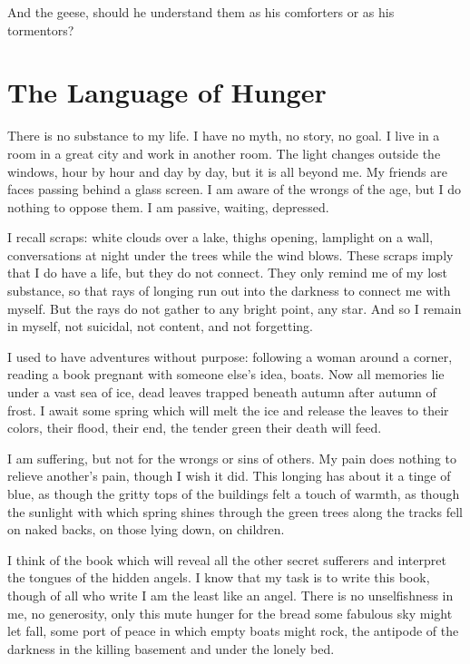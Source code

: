 \documentclass[english,11pt,letterpaper,onecolumn,parskip=full]{scrbook}
\begin{document}
	And the geese, should he understand them as his comforters or as his tormentors?

\newpage
\section{The Language of Hunger}
	There is no substance to my life.  I have no myth, no story, no goal.  I live in a room in a great city and work in another room.  The light changes outside the windows, hour by hour and day by day, but it is all beyond me.  My friends are faces passing behind a glass screen.  I am aware of the wrongs of the age, but I do nothing to oppose them.  I am passive, waiting, depressed.

	I recall scraps:  white clouds over a lake, thighs opening, lamplight on a wall, conversations at night under the trees while the wind blows.  These scraps imply that I do have a life, but they do not connect.  They only remind me of my lost substance, so that rays of longing run out into the darkness to connect me with myself.  But the rays do not gather to any bright point, any star.  And so I remain in myself, not suicidal, not content, and not forgetting.

	I used to have adventures without purpose:  following a woman around a corner, reading a book pregnant with someone else's idea, boats.  Now all memories lie under a vast sea of ice, dead leaves trapped beneath autumn after autumn of frost.  I await some spring which will melt the ice and release the leaves to their colors, their flood, their end, the tender green their death will feed.

	I am suffering, but not for the wrongs or sins of others.  My pain does nothing to relieve another's pain, though I wish it did.  This longing has about it a tinge of blue, as though the gritty tops of the buildings felt a touch of warmth, as though the sunlight with which spring shines through the green trees along the tracks fell on naked backs, on those lying down, on children.

	I think of the book which will reveal all the other secret sufferers and interpret the tongues of the hidden angels.  I know that my task is to write this book, though of all who write I am the least like an angel.  There is no unselfishness in me, no generosity, only this mute hunger for the bread some fabulous sky might let fall, some port of peace in which empty boats might rock, the antipode of the darkness in the killing basement and under the lonely bed.
\end{document}
